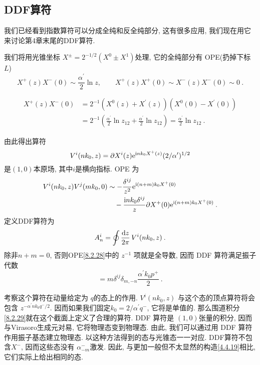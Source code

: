 \subsection*{DDF算符}

我们已经看到指数算符可以分成全纯和反全纯部分, 这有很多应用, 我们现在用它来讨论第4章末尾的DDF算符.

我们将用光锥坐标 $X^{\pm}=2^{-1 / 2}(X^{0} \pm X^{1})$处理, 它的全纯部分有 OPE(扔掉下标 $L$)
\begin{equation}
	X^{+}(z) X^{-}(0) \sim \frac{\alpha^{\prime}}{2} \ln z, \qquad X^{+}(z) X^{+}(0) \sim X^{-}(z) X^{-}(0) \sim 0 \:. \label{8.2.26}
\end{equation}
\begin{tcolorbox}
	\begin{remark}
		\begin{align*}
X^{+}(z) X^{-}(0) &=2^{-1}\left(X^{0}(z)+X^{\prime}(z)\right)\left(X^{0}(0)-X^{\prime}(0)\right) \\
&=2^{-1}\left(\frac{\alpha^{\prime}}{2} \ln z_{12}+\frac{\alpha^{\prime}}{2}\ln z_{12}\right)=\frac{\alpha^{\prime}}{2} \ln z_{12} \:.
		\end{align*}
	\end{remark}
\end{tcolorbox}
\noindent 由此得出算符
\begin{equation}
	V^{i}(n k_{0}, z)=\partial X^{i}(z) \mathrm{e}^{\mathrm{i} n k_{0} X^{+}(z)}(2 / \alpha^{\prime})^{1 / 2} \label{8.2.27}
\end{equation}
是$(1,0)$本原场, 其中$i$是横向指标. OPE 为
\begin{align}
	V^{i}(n k_{0}, z) V^{j}(m k_{0}, 0) &\sim-\frac{\delta^{i j}}{z^{2}} \mathrm{e}^{\mathrm{i}(n+m) k_{0} X^{+}(0)}  \nonumber \\
	&\quad -\frac{\mathrm{i} n k_{0} \delta^{i j}}{z} \partial X^{+}(0) \mathrm{e}^{\mathrm{i}(n+m) k_{0} X^{+}(0)} \:. \label{8.2.28}
\end{align}
定义DDF算符为
\begin{equation}
	A_{n}^{i}=\oint \frac{\mathrm{d} z}{2 \pi} \, V^{i}(n k_{0}, z) \:. \label{8.2.29}
\end{equation}
除非$n+m=0$, 否则OPE\eqref{8.2.28}中的 $z^{-1}$ 项就是全导数, 因而 DDF 算符满足振子代数
\begin{equation}
	[A_{m}^{i}, A_{n}^{j}]=m \delta^{i j} \delta_{m,-n} \frac{\alpha^{\prime} k_{0} p^{+}}{2} \:. \label{8.2.30}
\end{equation}

考察这个算符在动量给定为 $q$的态上的作用.  $V^{i}(n k_{0}, z)$ 与这个态的顶点算符将会包含 $z^{-\alpha^{\prime} n k_{0} q^{-} / 2}$. 
因而如果我们固定$k_{0}=2 / \alpha^{\prime} q^{-}$, 它将是单值的. 那么围道积分\eqref{8.2.29}就在这个截面上定义了合理的算符. 
DDF 算符是 $(1,0)$张量的积分, 因而与Virasoro生成元对易, 它将物理态变到物理态. 由此, 我们可以通过用 DDF 算符作用振子基态建立物理态. 
以这种方法得到的态与光锥态一一对应. DDF算符不包含$X^{-}$, 因而这些态没有 $\alpha_{-m}^{-}$激发. 
因此, 与更加一般但不太显然的构造\eqref{4.4.19}相比, 它们实际上给出相同的态.


